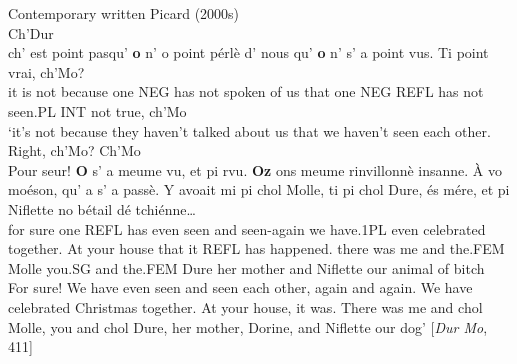\documentclass[output=paper,colorlinks,citecolor=brown]{langscibook}
\begin{document}
\ea \label{02:ex:13} Contemporary written Picard (2000s)\\
\ea Ch'Dur\\
\gll ch’ est point pasqu’ \textbf{o} n’ o point pérlè d’ nous qu’ \textbf{o} n’ s’ a point vus. Ti point vrai, ch’Mo?\\
it is not because one NEG has not spoken of us that one NEG REFL has not seen.PL INT not true, ch’Mo\\ 
\glt ‘it’s not because they haven’t talked about us that we haven’t seen each other. Right, ch’Mo?
\ex Ch'Mo\\
\gll Pour seur! \textbf{O} s’ a meume vu, et pi rvu. \textbf{Oz} ons meume rinvillonnè insanne. À vo moéson, qu’ a s’ a passè. Y avoait mi pi chol Molle, ti pi chol Dure, és mére, et pi Niflette no bétail dé tchiénne…\\
for sure one REFL has even seen and \textit{\textbf{ }} seen-again  we have.1PL even celebrated together. At your house that it REFL has happened. there was me and the.FEM Molle  you.SG and the.FEM Dure her mother and \textit{\textbf{ }} Niflette our animal of bitch\\
\glt For sure! We have even seen and seen each other, again and again. We have celebrated Christmas together. At your house, it was. There was me and chol Molle, you and chol Dure, her mother, Dorine, and Niflette our dog’ [\textit{Dur Mo}, 411]
\z
\z
\end{document}
